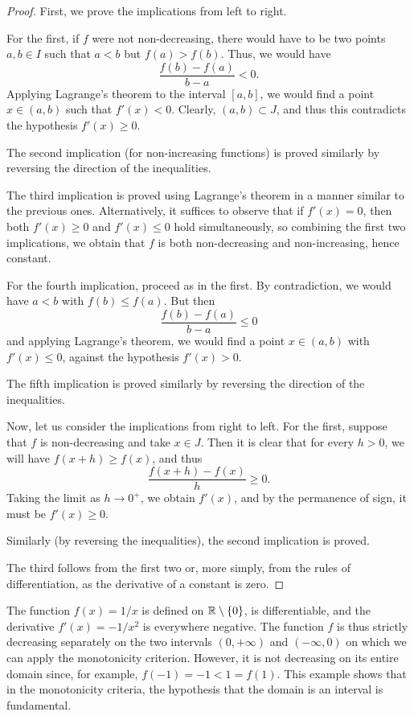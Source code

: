 \begin{proof}
\mymark{***}
First, we prove the implications from left to right.

For the first, if $f$ were not non-decreasing, there would have to be two points
$a, b \in I$ such that $a < b$ but $f(a) > f(b)$.
Thus, we would have
\[
  \frac{f(b) - f(a)}{b - a} < 0.
\]
Applying Lagrange's theorem to the interval $[a,b]$, we would find a point $x\in
(a,b)$ such that $f'(x) < 0$. Clearly, $(a,b)\subset J$, and thus this
contradicts the hypothesis $f'(x) \ge 0$.

The second implication (for non-increasing functions) is proved similarly by
reversing the direction of the inequalities.

The third implication is proved using Lagrange's theorem in a manner similar to
the previous ones. Alternatively, it suffices to observe that if $f'(x)=0$, then
both $f'(x)\ge 0$ and $f'(x)\le 0$ hold simultaneously, so combining the first
two implications, we obtain that $f$ is both non-decreasing and non-increasing,
hence constant.

For the fourth implication, proceed as in the first. By contradiction, we would
have $a<b$ with $f(b) \le f(a)$. But then
\[
  \frac{f(b) - f(a)}{b-a} \le 0
\]
and applying Lagrange's theorem, we would find a point $x\in (a,b)$ with $f'(x)
\le 0$, against the hypothesis $f'(x) > 0$.

The fifth implication is proved similarly by reversing the direction of the
inequalities.

Now, let us consider the implications from right to left.
For the first, suppose that $f$ is non-decreasing and take $x\in J$. Then it is
clear that for every $h>0$, we will have $f(x+h) \ge f(x)$, and thus
\[
  \frac{f(x+h)- f(x)}{h} \ge 0.
\]
Taking the limit as $h \to 0^+$, we obtain $f'(x)$, and by the permanence of
sign, it must be $f'(x) \ge 0$.

Similarly (by reversing the inequalities), the second implication is proved.

The third follows from the first two or, more simply, from the rules of
differentiation, as the derivative of a constant is zero.
\end{proof}

\begin{example}
The function $f(x) = 1/x$ is defined on ${\mathbb R} \setminus {\left\{ 0 \right\}}$, is
differentiable,
and the derivative $f'(x) = -1/x^2$ is everywhere negative. The function $f$ is
thus strictly
decreasing separately on the two intervals $(0,+\infty)$ and $(-\infty,0)$ on
which
we can apply the monotonicity criterion. However, it is not
decreasing on its entire domain since, for example, $f(-1) = -1 < 1 = f(1)$.
This example shows that in the monotonicity criteria, the hypothesis that the
domain is an interval
is fundamental.
\end{example}

